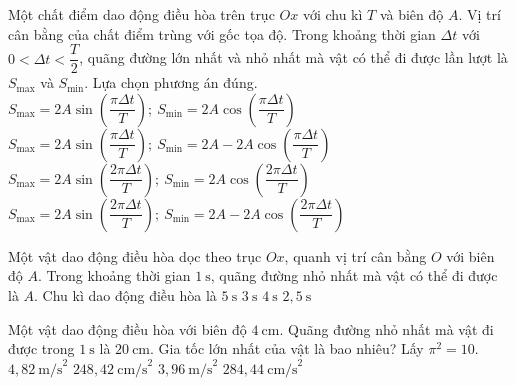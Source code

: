 \begin{ex}
Một chất điểm dao động điều hòa trên trục $Ox$ với chu kì $T$ và biên độ $A$. Vị trí cân bằng của chất điểm trùng với gốc tọa độ. Trong khoảng thời gian $\Delta t$ với $0\lt \Delta t<\dfrac{T}{2}$, quãng đường lớn nhất và nhỏ nhất mà vật có thể đi được lần lượt là $S_{\max}$ và $S_{\min}$. Lựa chọn phương án đúng.
\choice
{$S_{\max}=2A\sin\left(\dfrac{\pi\Delta t}{T}\right);\ S_{\min}=2A\cos\left(\dfrac{\pi\Delta t}{T}\right)$}
{\True $S_{\max}=2A\sin\left(\dfrac{\pi\Delta t}{T}\right);\ S_{\min}=2A-2A\cos\left(\dfrac{\pi\Delta t}{T}\right)$}
{$S_{\max}=2A\sin\left(\dfrac{2\pi\Delta t}{T}\right);\ S_{\min}=2A\cos\left(\dfrac{2\pi\Delta t}{T}\right)$}
{$S_{\max}=2A\sin\left(\dfrac{2\pi\Delta t}{T}\right);\ S_{\min}=2A-2A\cos\left(\dfrac{2\pi\Delta t}{T}\right)$}
\end{ex}

\begin{ex}
Một vật dao động điều hòa dọc theo trục $Ox$, quanh vị trí cân bằng $O$ với biên độ $A$. Trong khoảng thời gian $1\ \text{s}$, quãng đường nhỏ nhất mà vật có thể đi được là $A$. Chu kì dao động điều hòa là
\choice
{$5\ \text{s}$}
{\True $3\ \text{s}$}
{$4\ \text{s}$}
{$2,5\ \text{s}$}
\end{ex}

\begin{ex}
Một vật dao động điều hòa với biên độ $4\ \text{cm}$. Quãng đường nhỏ nhất mà vật đi được trong $1\ \text{s}$ là $20\ \text{cm}$. Gia tốc lớn nhất của vật là bao nhiêu? Lấy $\pi^2=10$.
\choice
{$4,82\ \text{m/s}^2$}
{$248,42\ \text{cm/s}^2$}
{$3,96\ \text{m/s}^2$}
{\True $284,44\ \text{cm/s}^2$}
\end{ex}

